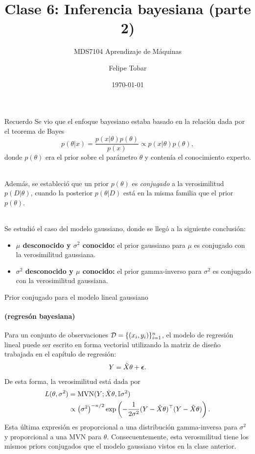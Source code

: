 \documentclass[9pt, handout]{beamer}
\title{Clase 6: Inferencia bayesiana (parte 2)}
\subtitle{MDS7104 Aprendizaje de Máquinas}
\date{\today}
\author{Felipe Tobar}
\institute{Iniciativa de Datos e Inteligencia Artificial\\Universidad de Chile}
\begin{document}
\begin{frame}
  \titlepage
\end{frame}

\begin{frame}{Recuerdo}
Se vio que el enfoque bayesiano estaba basado en la relación dada por el teorema de Bayes
	\begin{equation*}
	p(\theta|x) = \frac{p(x|\theta)p(\theta)}{p(x)} \propto p(x|\theta)p(\theta),\label{eq:Bayes}
\end{equation*}
donde $p(\theta)$ era el prior sobre el parámetro $\theta$ y contenía el conocimiento experto.\\~\ \pause

Además, se estableció que un prior $p(\theta)$ es \emph{conjugado} a la verosimilitud $p(D|\theta)$, cuando la posterior $p(\theta|D)$ está en la misma familia que el prior $p(\theta)$.\\~\ \pause

Se estudió el caso del modelo gaussiano, donde se llegó a la siguiente conclusión:

\begin{itemize}
	\item \textbf{$\mu$ desconocido y $\sigma^2$ conocido:} el prior gaussiano para $\mu$ es conjugado con la verosimilitud gaussiana.
	\item \textbf{$\sigma^2$ desconocido y $\mu$ conocido:} el prior gamma-inverso para $\sigma^2$ es conjugado con la verosimilitud gaussiana. 
\end{itemize}

\end{frame}

\begin{frame}{Prior conjugado para el modelo lineal gaussiano}
\framesubtitle{(regresón bayesiana)}

Para un conjunto de observaciones ${\mathcal D}=\{(x_i,y_i)\}_{i=1}^n$, el modelo de regresión lineal puede ser escrito en forma vectorial utilizando la matriz de diseño trabajada en el capítulo de regresión:
\begin{equation*}
 	Y = \tilde{X}\theta + {\bm \epsilon}.
 \end{equation*} \pause
De esta forma, la verosimilitud está dada por 
\begin{align*}
	L(\theta,\sigma^2) &= \operatorname{\text{MVN}}(Y; \tilde{X}\theta, {\mathbb I}\sigma^2)\\
					&\propto \left(\sigma^2\right)^{-n/2}   \exp\left(-\frac{1}{2\sigma^2} (Y - \tilde{X}\theta)^\top(Y - \tilde{X}\theta)\right).\nonumber
\end{align*} \pause
Esta última  expresión es proporcional a una distribución gamma-inversa para $\sigma^2$ y proporcional a una MVN para $\theta$. Consecuentemente, esta verosmilitud tiene los mismos priors conjugados que el modelo gaussiano vistos en la clase anterior. 
	
\end{frame}
\end{document}
